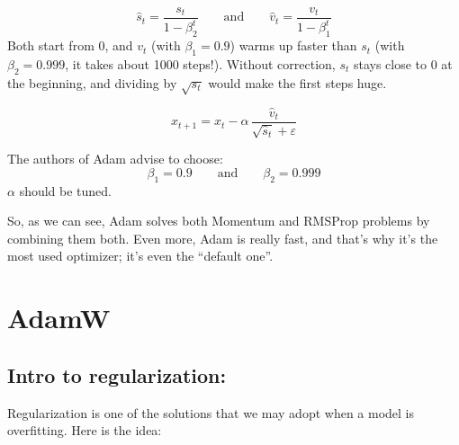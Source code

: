 \begin{warnbox}
\[
\hat s_t=\frac{s_t}{1-\beta_2^t}\qquad\text{and}\qquad\hat v_t=\frac{v_t}{1-\beta_1^t}
\]
Both start from 0, and $v_t$ (with $\beta_1=0.9$) warms up faster than $s_t$ (with $\beta_2=0.999$, it takes about 1000 steps!). Without correction, $s_t$ stays close to 0 at the beginning, and dividing by $\sqrt{s_t}$ would make the first steps huge.\ednotemark
\end{warnbox}

\begin{keyformula}
\[
x_{t+1}=x_t-\alpha\,\frac{\hat v_t}{\sqrt{\hat s_t}+\varepsilon}
\]
\end{keyformula}

The authors of Adam advise to choose:
\[
\beta_1=0.9\qquad\text{and}\qquad\beta_2=0.999
\]
$\alpha$ should be tuned.

So, as we can see, Adam solves both Momentum and RMSProp problems by combining them both. Even more, Adam is really fast, and that's why it's the most used optimizer; it's even the ``default one''.

\section{AdamW}

\subsection*{\color{inkgreen}Intro to regularization:}

Regularization is one of the solutions that we may adopt when a model is overfitting. Here is the idea:

